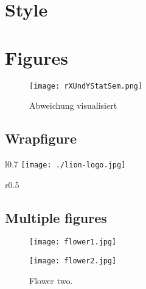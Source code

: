 \section{Style}
\usepackage[doublespacing]{setspace} %

\section{Figures}

\begin{figure}[H]
  \centering\texttt{[image: rXUndYStatSem.png]}
  \caption{Abweichung visualisiert\cite{statistikSeminar}}
  \label{fig:rUndXY}
\end{figure}

\subsection{Wrapfigure}

\begin{wrapfigure}{l}{0.7\linewidth}
  \texttt{[image: ./lion-logo.jpg]}
  \caption{This is the former Share\LaTeX{} logo}
  \label{fig:_name_}
\end{wrapfigure}

\begin{wrapfigure}{r}{0.5\textwidth}
    \vspace{-25pt}
    \vspace{-20pt}
  \caption{Triangulation \cite{poleTagging}}
  \label{fig:triang}
    \vspace{-6pt}
\end{wrapfigure}

\subsection{Multiple figures}

\begin{figure}[!tbp]
  \centering
  \begin{minipage}[b]{0.4\textwidth}
    \texttt{[image: flower1.jpg]}
    \caption{Flower one.}
  \end{minipage}
  \hfill
  \begin{minipage}[b]{0.4\textwidth}
    \texttt{[image: flower2.jpg]}
    \caption{Flower two.}
  \end{minipage}
\end{figure}

